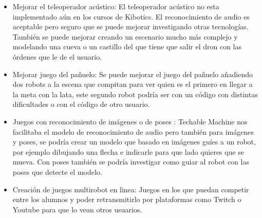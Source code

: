 \begin{itemize}
\item Mejorar el teleoperador acústico: El teleoperador acústico no esta implementado aún en los cursos de  Kibotics. El reconocimiento de audio es aceptable pero seguro que se puede mejorar investigando otras tecnologías. También se puede mejorar creando un escenario mucho más complejo y modelando una cueva o un castillo del que tiene que salir el dron con las órdenes que le de el usuario.

\item Mejorar juego del pañuelo: Se puede mejorar el juego del pañuelo añadiendo dos robots a la escena que compitan para ver quien es el primero en llegar a la meta con la lata, este segundo robot podría ser con un código con distintas dificultades o con el código de otro usuario.

\item  Juegos con reconocimiento de imágenes o de poses : Techable Machine nos facilitaba el modelo de reconocimiento de audio pero también para imágenes y poses, se podría crear un modelo que basado en imágenes guíes a un robot, por ejemplo dibujando una flecha e indicarle para que lado quieres que se mueva. Con poses también se podría investigar como guiar al robot con las poses que detecte el modelo.

\item Creación de juegos multirobot en linea:  Juegos en los que puedan competir entre los alumnos y poder retransmitirlo por plataformas como Twitch o Youtube para que lo vean otros usuarios.


\end{itemize}
